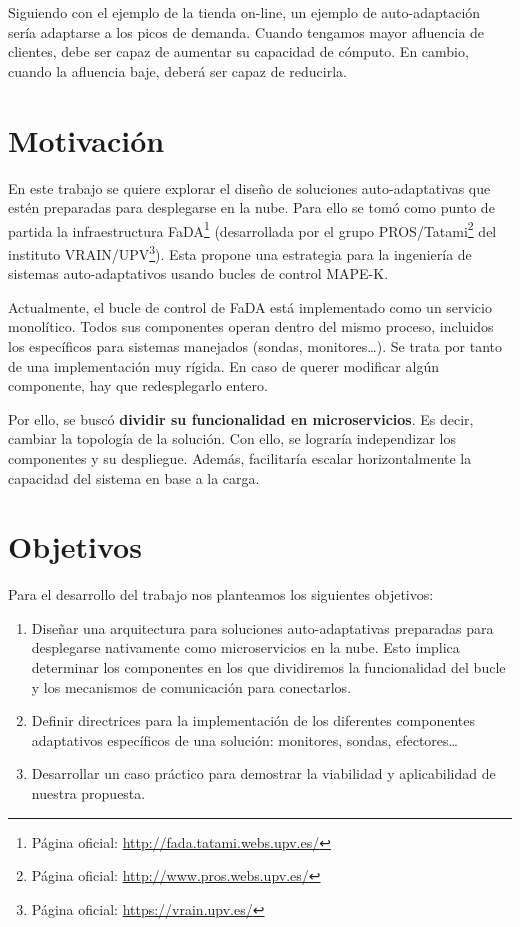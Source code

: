 Siguiendo con el ejemplo de la tienda on-line, un ejemplo de auto-adaptación sería adaptarse a los picos de demanda. Cuando tengamos mayor afluencia de clientes, debe ser capaz de aumentar su capacidad de cómputo. En cambio, cuando la afluencia baje, deberá ser capaz de reducirla.

\section{Motivación}

En este trabajo se quiere explorar el diseño de soluciones auto-adaptativas que estén preparadas para desplegarse en la nube. Para ello se tomó como punto de partida la infraestructura FaDA\footnote{Página oficial: \url{http://fada.tatami.webs.upv.es/}} (desarrollada por el grupo PROS/Tatami\footnote{Página oficial: \url{http://www.pros.webs.upv.es/}} del instituto VRAIN/UPV\footnote{Página oficial: \url{https://vrain.upv.es/}}). Esta propone una estrategia para la ingeniería de sistemas auto-adaptativos usando bucles de control MAPE-K\cite{ibmcorporationArchitecturalBlueprintAutonomic2006, fonsServiciosAdaptivereadyPara2021}.

Actualmente, el bucle de control de FaDA está implementado como un servicio monolítico. Todos sus componentes operan dentro del mismo proceso, incluidos los específicos para sistemas manejados (sondas, monitores\dots). Se trata por tanto de una implementación muy rígida. En caso de querer modificar algún componente, hay que redesplegarlo entero.

Por ello, se buscó \textbf{dividir su funcionalidad en microservicios}. Es decir, cambiar la topología de la solución. Con ello, se lograría independizar los componentes y su despliegue. Además, facilitaría escalar horizontalmente la capacidad del sistema en base a la carga.

\section{Objetivos}

Para el desarrollo del trabajo nos planteamos los siguientes objetivos:

\begin{enumerate}
  \item Diseñar una arquitectura para soluciones auto-adaptativas preparadas para desplegarse nativamente como microservicios en la nube. Esto implica determinar los componentes en los que dividiremos la funcionalidad del bucle y los mecanismos de comunicación para conectarlos.

  \item Definir directrices para la implementación de los diferentes componentes adaptativos específicos de una solución: monitores, sondas, efectores\dots

  \item Desarrollar un caso práctico para demostrar la viabilidad y aplicabilidad de nuestra propuesta.
\end{enumerate}

